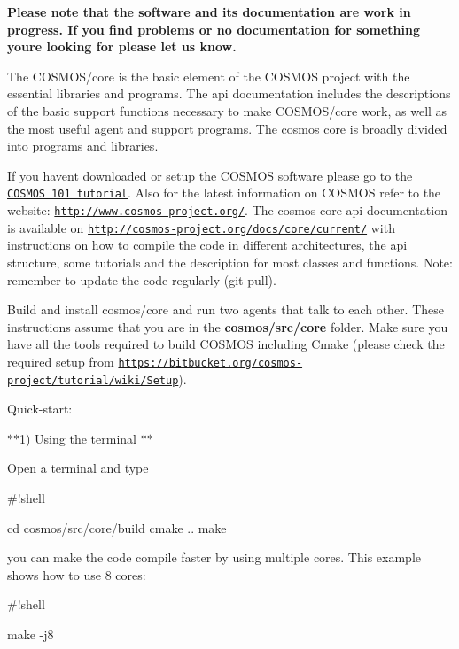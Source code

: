 {\bfseries Please note that the software and its documentation are work in progress. If you find problems or no documentation for something you\textquotesingle{}re looking for please let us know.}

The C\+O\+S\+M\+O\+S/core is the basic element of the C\+O\+S\+M\+OS project with the essential libraries and programs. The api documentation includes the descriptions of the basic support functions necessary to make C\+O\+S\+M\+O\+S/core work, as well as the most useful agent and support programs. The cosmos core is broadly divided into programs and libraries.

If you haven\textquotesingle{}t downloaded or setup the C\+O\+S\+M\+OS software please go to the \href{https://bitbucket.org/cosmos-project/tutorial/wiki/Home}{\tt C\+O\+S\+M\+OS 101 tutorial}. Also for the latest information on C\+O\+S\+M\+OS refer to the website\+: \href{http://www.cosmos-project.org/}{\tt http\+://www.\+cosmos-\/project.\+org/}. The cosmos-\/core api documentation is available on \href{http://cosmos-project.org/docs/core/current/}{\tt http\+://cosmos-\/project.\+org/docs/core/current/} with instructions on how to compile the code in different architectures, the api structure, some tutorials and the description for most classes and functions. Note\+: remember to update the code regularly (git pull).

Build and install cosmos/core and run two agents that talk to each other. These instructions assume that you are in the {\bfseries cosmos/src/core} folder. Make sure you have all the tools required to build C\+O\+S\+M\+OS including Cmake (please check the required setup from \href{https://bitbucket.org/cosmos-project/tutorial/wiki/Setup}{\tt https\+://bitbucket.\+org/cosmos-\/project/tutorial/wiki/\+Setup}).

Quick-\/start\+:

$\ast$$\ast$1) Using the terminal $\ast$$\ast$

Open a terminal and type


\begin{DoxyCode}
#!shell

cd cosmos/src/core/build
cmake ..
make
\end{DoxyCode}


you can make the code compile faster by using multiple cores. This example shows how to use 8 cores\+: 
\begin{DoxyCode}
#!shell

make -j8
\end{DoxyCode}


